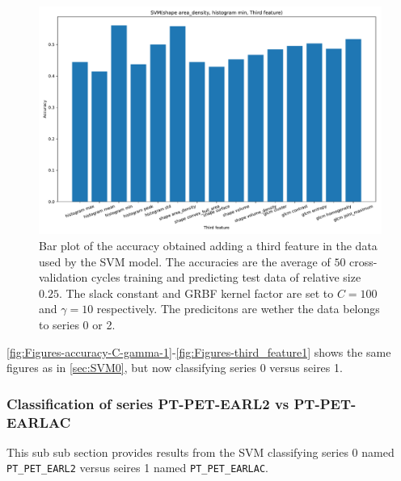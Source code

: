 \begin{figure}[H]
\centering
\includegraphics[width=1\textwidth]{Figures/third_feature1}
\caption{Bar plot of the accuracy obtained adding a third feature in the data used 
by the SVM model. The accuracies are the average 
of $50$ cross-validation cycles training and predicting test data of relative size $0.25$.
The slack constant and GRBF kernel factor are set to $C=100$ and $\gamma=10 $ respectively. 
 The predicitons are wether the data belongs to series 0 or 2.}
\label{fig:Figures-third_feature1}
\end{figure}

\autoref{fig:Figures-accuracy-C-gamma-1}-\autoref{fig:Figures-third_feature1} shows the same figures as in \autoref{sec:SVM0}, but now 
classifying series 0 versus seires 1.  

\subsubsection{Classification of series PT-PET-EARL2 vs PT-PET-EARLAC}

This sub sub section provides results from the SVM classifying series 0 named \verb|PT_PET_EARL2|
versus seires 1 named \verb|PT_PET_EARLAC|.   

